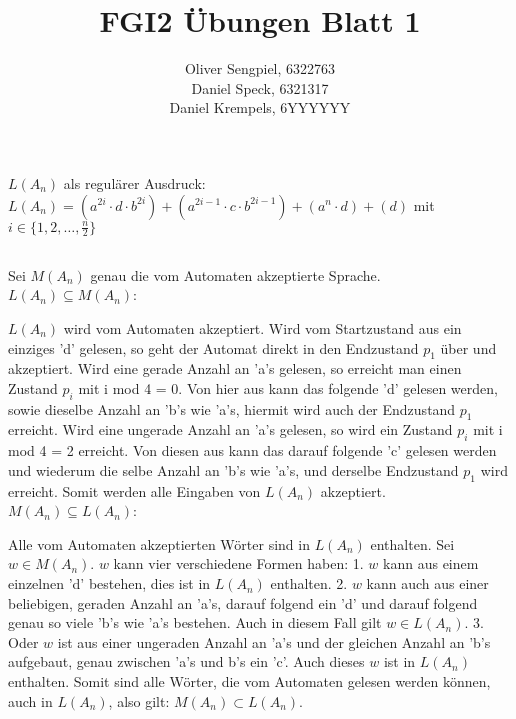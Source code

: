 \documentclass{article}
\title{FGI2 Übungen Blatt 1}
\author{Oliver Sengpiel, 6322763 \\ Daniel Speck, 6321317 \\ Daniel
Krempels, 6YYYYYY}
\begin{document}
\maketitle
\setcounter{section}{2}
\section{}
\subsection{} 
$L(A_n)$ als regulärer Ausdruck: \\
$L(A_n) = (a^{2i}\cdot d\cdot b^{2i}) + (a^{2i-1}\cdot c\cdot
b^{2i-1}) + (a^{n}\cdot d) + (d)$ mit $i \in \{1, 2, \dots, \frac{n}{2}
\}$

\subsection{}
Sei $M(A_n)$ genau die vom Automaten akzeptierte Sprache. \\ $L(A_n)
\subseteq M(A_n)$: 

$L(A_n)$ wird vom Automaten akzeptiert. Wird vom Startzustand aus
ein einziges 'd' gelesen, so geht der Automat direkt in den
Endzustand $p_1$ über und akzeptiert. Wird eine gerade Anzahl an
'a's gelesen, so erreicht man einen Zustand $p_i$ mit i mod 4 = 0.
Von hier aus kann das folgende 'd' gelesen werden, sowie dieselbe
Anzahl an 'b's wie 'a's, hiermit wird auch der Endzustand $p_1$
erreicht. Wird eine ungerade Anzahl an 'a's gelesen, so wird ein
Zustand $p_i$ mit i mod 4 = 2 erreicht. Von diesen aus kann das
darauf folgende 'c' gelesen werden und wiederum die selbe Anzahl an
'b's wie 'a's, und derselbe Endzustand $p_1$ wird erreicht. Somit
werden alle Eingaben von $L(A_n)$ akzeptiert. \\ $M(A_n) \subseteq
L(A_n)$: 

Alle vom Automaten akzeptierten Wörter sind in $L(A_n)$ enthalten.
Sei $w \in M(A_n)$. $w$ kann vier verschiedene Formen haben: 1. $w$
kann aus einem einzelnen 'd' bestehen, dies ist in $L(A_n)$
enthalten. 2. $w$ kann auch aus einer beliebigen, geraden Anzahl an
'a's, darauf folgend ein 'd' und darauf folgend genau so viele 'b's
wie 'a's bestehen. Auch in diesem Fall gilt $w \in L(A_n)$. 3. Oder
$w$ ist aus einer ungeraden Anzahl an 'a's und der gleichen Anzahl
an 'b's aufgebaut, genau zwischen 'a's und b's ein 'c'. Auch dieses
$w$ ist in $L(A_n)$ enthalten. Somit sind alle Wörter, die vom
Automaten gelesen werden können, auch in $L(A_n)$, also gilt:
$M(A_n) \subset L(A_n)$. 
\end{document}
